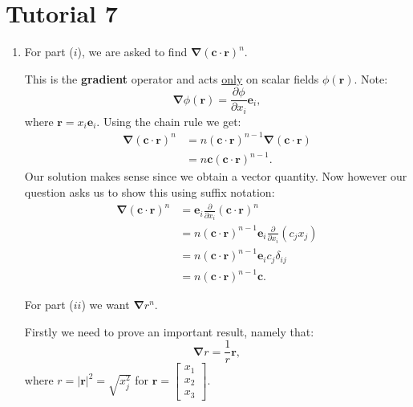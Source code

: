 \pagestyle{fancy}
\fancyhead{}

\section{Tutorial 7}
\begin{enumerate}
    \item For part ($i$), we are asked to find $\boldsymbol{\nabla}(\boldsymbol{c}\cdot\boldsymbol{r})^n$.

    This is the \textbf{gradient} operator and acts \underline{only} on scalar fields $\phi(\boldsymbol{r})$. Note:
    $$\boldsymbol{\nabla}\phi(\boldsymbol{r})=\frac{\partial\phi}{\partial x_i}\boldsymbol{e}_i,$$
    where $\boldsymbol{r}=x_i\boldsymbol{e}_i$. Using the chain rule we get:
    \begin{align*}
        \boldsymbol{\nabla}(\boldsymbol{c}\cdot\boldsymbol{r})^n
        &= n(\boldsymbol{c}\cdot\boldsymbol{r})^{n-1}
        \boldsymbol{\nabla}(\boldsymbol{c}\cdot\boldsymbol{r}) \\
        &= n\boldsymbol{c}(\boldsymbol{c}\cdot\boldsymbol{r})^{n-1}.
    \end{align*}
    Our solution makes sense since we obtain a vector quantity. Now however our question asks us to
    show this using suffix notation:
    \begin{align*}
        \boldsymbol{\nabla}(\boldsymbol{c}\cdot\boldsymbol{r})^n
        &=\boldsymbol{e}_i\frac{\partial}{\partial x_i}(\boldsymbol{c}\cdot\boldsymbol{r})^n \\
        &=n(\boldsymbol{c}\cdot\boldsymbol{r})^{n-1}
        \boldsymbol{e}_i\frac{\partial}{\partial x_i}(c_j x_j) \\
        &=n(\boldsymbol{c}\cdot\boldsymbol{r})^{n-1}
        \boldsymbol{e}_i c_j\delta_{ij} \\
        &=n(\boldsymbol{c}\cdot\boldsymbol{r})^{n-1}
        \boldsymbol{c}.
    \end{align*}

    For part ($ii$) we want $\boldsymbol{\nabla}r^n$.

    Firstly we need to prove an important result, namely that:
    $$\boldsymbol{\nabla}r=\frac{1}{r}\boldsymbol{r},$$
    where $r=|\boldsymbol{r}|^2=\sqrt{x_j^2}$ for
    $\boldsymbol{r}=\begin{bmatrix} x_1 \\ x_2 \\ x_3\end{bmatrix}$.


\end{enumerate}

